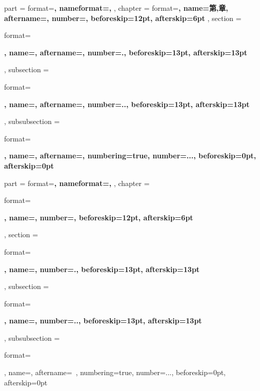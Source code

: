 {
    \ctexset
    {
        part =
        {
            format=\centering{}\bfseries,
            nameformat=\centering\heiti\fontsize{48}{48}\bfseries,
        },
        chapter =
        {
            format=\centering{}\heiti\bfseries,
            name={第,章},
            aftername=\hspace{1em},
            number=,
            beforeskip=12pt,
            afterskip=6pt
        },
        section =
        {
            format=\raggedright{}\heiti\bfseries,
            name={},
            aftername=\hspace{1em},
            number=.,
            beforeskip=13pt,
            afterskip=13pt
        },
        subsection =
        {
            format=\raggedright\fontsize{13pt}{13pt}\heiti\bfseries,
            name={},
            aftername=\hspace{1em},
            number=..,
            beforeskip=13pt,
            afterskip=13pt
        },
        subsubsection =
        {
            format=\raggedright{}\heiti\bfseries,
            name={},
            aftername=\hspace{1em},
            numbering=true,
            number=...,
            beforeskip=0pt,
            afterskip=0pt
        }
    }
}
{
    \ctexset
    {
        part =
        {
            format=\centering{}\bfseries,
            nameformat=\centering\heiti\fontsize{48}{48}\bfseries,
        },
        chapter =
        {
            format=\raggedright{}\bfseries,
            name={},
            number=,
            beforeskip=12pt,
            afterskip=6pt
        },
        section =
        {
            format=\raggedright{}\bfseries,
            name={},
            number=.,
            beforeskip=13pt,
            afterskip=13pt
        },
        subsection =
        {
            format=\raggedright{}\bfseries,
            name={},
            number=..,
            beforeskip=13pt,
            afterskip=13pt
        },
        subsubsection =
        {
            format=\raggedright{},
            name={},
            aftername=~,
            numbering=true,
            number=...,
            beforeskip=0pt,
            afterskip=0pt
        }
    }
}

